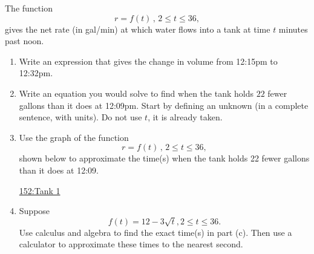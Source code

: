 \documentclass{ximera}
\begin{document}
\begin{question} \label{Q3edFGee}

The function
\[
 r =f(t) \, , \,  2 \leq t  \leq 36,
\]
 gives the net rate (in gal/min) at which water flows into a tank at time $t$ minutes past noon.

\begin{enumerate}
\item Write an expression that gives the change in volume from 12:15pm to 12:32pm.

\item Write an equation you would solve to find when the tank holds $22$ fewer gallons than it does at 12:09pm. Start by defining an unknown (in a complete sentence, with units). Do not use $t$, it is already taken.

\item Use the graph of the function
 \[
 r =f(t) \, , \,  2 \leq t  \leq 36,
\]
 shown below to approximate the time(s) when the tank holds 22 fewer gallons than it does at 12:09. 


\begin{onlineOnly}
    \begin{center}
\end{center}
\end{onlineOnly}

\href{https://www.desmos.com/calculator/rcsfzdhsax}{152:Tank 1}

\item Suppose 
\[
     f(t) = 12 - 3\sqrt{t} , 2\leq t \leq 36 .
\] 
Use calculus and algebra to find the exact time(s) in part (c). Then use a calculator to approximate these times to the nearest second.

\end{enumerate}
\end{question}
\end{document}
